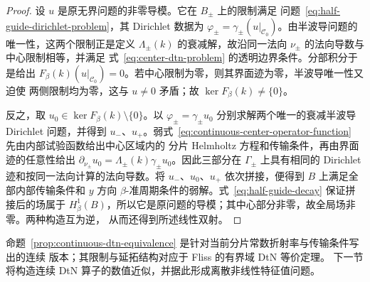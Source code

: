 \begin{proof}
  设 $u$ 是原无界问题的非零导模。它在 $B_\pm$ 上的限制满足
  问题~\eqref{eq:half-guide-dirichlet-problem}，其 Dirichlet 数据为
  $\varphi_\pm=\gamma_\pm(u|_{\mathcal{C}_0})$。由半波导问题的唯一性，这两个限制正是定义
  $\Lambda_\pm(k)$ 的衰减解，故沿同一法向 $\nu_\pm$ 的法向导数与中心限制相等，并满足
  式~\eqref{eq:center-dtn-problem} 的透明边界条件。分部积分于是给出
  $F_\beta(k)(u|_{\mathcal{C}_0})=0$。若中心限制为零，则其界面迹为零，半波导唯一性又迫使
  两侧限制均为零，这与 $u\ne0$ 矛盾；故 $\ker F_\beta(k)\ne\{0\}$。

  反之，取 $u_0\in\ker F_\beta(k)\setminus\{0\}$。以
  $\varphi_\pm=\gamma_\pm u_0$ 分别求解两个唯一的衰减半波导 Dirichlet 问题，并得到
  $u_-$、$u_+$。弱式~\eqref{eq:continuous-center-operator-function} 先由内部试验函数给出中心区域内的
  分片 Helmholtz 方程和传输条件，再由界面迹的任意性给出
  $\partial_{\nu_\pm}u_0=\Lambda_\pm(k)\gamma_\pm u_0$。因此三部分在
  $\Gamma_\pm$ 上具有相同的 Dirichlet 迹和按同一法向计算的法向导数。将
  $u_-$、$u_0$、$u_+$ 依次拼接，便得到 $B$ 上满足全部内部传输条件和 $y$ 方向
  $\beta$-准周期条件的弱解。式~\eqref{eq:half-guide-decay} 保证拼接后的场属于
  $H^1_\beta(B)$，所以它是原问题的导模；其中心部分非零，故全局场非零。两种构造互为逆，
  从而还得到所述线性双射。
\end{proof}

命题~\ref{prop:continuous-dtn-equivalence} 是针对当前分片常数折射率与传输条件写出的连续
版本；其限制与延拓结构对应于 Fliss 的有界域 DtN 等价定理\cite[定理~4.5]{Fliss2013}。
下一节将构造连续 DtN 算子的数值近似，并据此形成离散非线性特征值问题。

